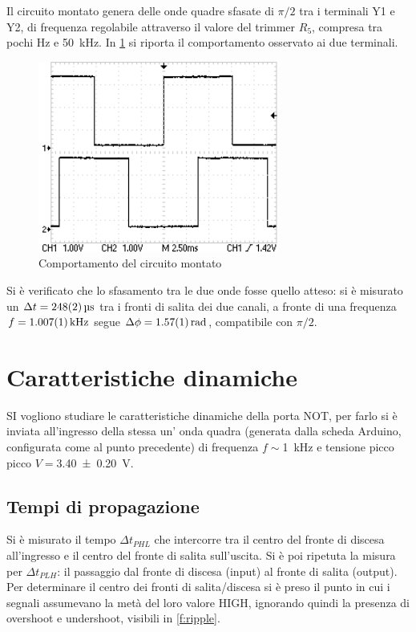 \documentclass[a4paper,11pt]{article}
\begin{document}
Il circuito montato genera delle onde quadre sfasate di $\pi/2$ tra i terminali Y1 e Y2, di frequenza regolabile attraverso il valore del trimmer $R_{5}$, compresa tra pochi \si{\hertz} e \SI{50}{\kilo\hertz}.
In \figurename{ \ref{f:oscil}} si riporta il comportamento osservato ai due terminali.

\begin{figure}[htb]
	\centering
	\includegraphics[scale=0.80]{ondaquadra_esempio.png}
	\caption{Comportamento del circuito montato}
	\label{f:oscil}
\end{figure}

Si è verificato che lo sfasamento tra le due onde fosse quello atteso: si è misurato un $\Delta t=\SI{248 \pm 2}{\micro\second}$ tra i fronti di salita dei due canali, a fronte di una frequenza $f=\SI{1.007 \pm 0.001}{\kilo \hertz}$ segue $\Delta \phi=\SI{1.57 \pm 0.01 }{\radian}$, compatibile con $\pi/2$.
\section{Caratteristiche dinamiche}
SI vogliono studiare le caratteristiche dinamiche della porta NOT, per farlo si è inviata all'ingresso della stessa un' onda quadra (generata dalla scheda Arduino, configurata come al punto precedente) di frequenza  $f\sim$\SI{1}{\kilo \hertz} e tensione picco picco $V=$\SI{3.40 \pm 0.20}{\volt}.

\subsection{Tempi di propagazione}
Si è misurato il tempo $\Delta t_{PHL}$ che intercorre tra il centro del fronte di discesa all'ingresso e il centro del fronte di salita sull'uscita. Si è poi ripetuta la misura per $\Delta t_{PLH}$: il passaggio dal fronte di discesa (input) al fronte di salita (output).
Per determinare il centro dei fronti di salita/discesa si è preso il punto in cui i segnali assumevano la metà del loro valore HIGH, ignorando quindi la presenza di overshoot e undershoot, visibili in \figurename{ \ref{f:ripple}}.
\end{document}
